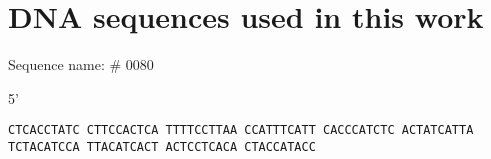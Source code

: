 \chapter{DNA sequences used in this work}
\label{sequences}

{\setlength{\parindent}{0cm}
Sequence name: \# 0080

5'

\texttt{CTCACCTATC CTTCCACTCA TTTTCCTTAA CCATTTCATT CACCCATCTC ACTATCATTA TCTACATCCA TTACATCACT ACTCCTCACA CTACCATACC}

}